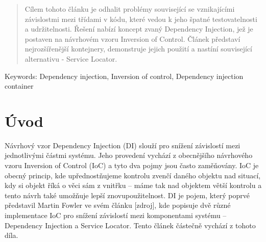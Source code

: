 \documentclass[a4paper,conference]{IEEEtran}
\begin{document}
\begin{abstract}
Cílem tohoto článku je odhalit problémy související se vznikajícími závislostmi mezi třídami v kódu, které vedou k jeho špatné testovatelnosti a udržitelnosti. Řešení nabízí koncept zvaný Dependency Injection, jež je postaven na návrhovém vzoru Inversion of Control. Článek představí nejrozšířenější kontejnery, demonstruje jejich použití a nastíní související alternativu - Service Locator.
\end{abstract}











\begin{IEEEkeywords}
Keywords: Dependency injection, Inversion of control, Dependency injection container
\end{IEEEkeywords}


%
\IEEEpeerreviewmaketitle



\section{Úvod}
Návrhový vzor Dependency Injection (DI) slouží pro snížení závislostí mezi jednotlivými částmi systému. Jeho provedení vychází z obecnějšího návrhového vzoru Inversion of Control (IoC) a tyto dva pojmy jsou často zaměňovány.
IoC je obecný princip, kde upřednostňujeme kontrolu zvenčí daného objektu nad situací, kdy si objekt říká o věci sám z vnitřku – máme tak nad objektem větší kontrolu a tento návrh také umožňuje lepší znovupoužitelnost.
DI je pojem, který poprvé představil Martin Fowler ve svém článku [zdroj], kde popisuje dvě různé implementace IoC pro snížení závislostí mezi komponentami systému – Dependency Injection a Service Locator. Tento článek částečně vychází z tohoto díla.
\end{document}
